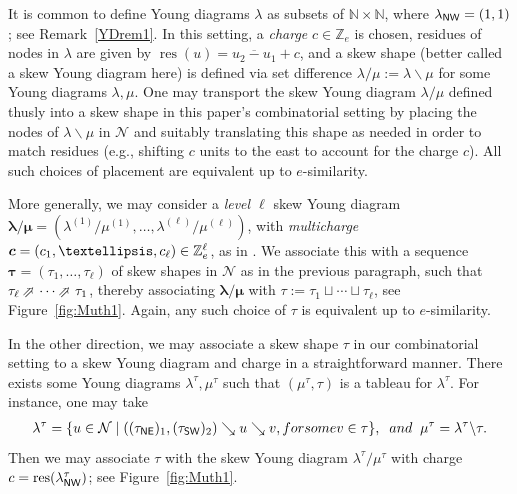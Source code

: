 \documentclass[Unicode,ALCO]{cedram}
\def\bc{\text{\boldmath$c$}}
\newcommand{\res}{\operatorname{res}}
\newcommand{\Z}{\mathbb{Z}}
\newcommand{\N}{\mathcal{N}}
\newcommand{\0}{{\bar 0}}
\newcommand{\NEarrow}{\mathbin{\rotatebox[origin=c]{45}{$\Rightarrow$}}}
\newcommand{\ZZ}{{\mathbb Z}}
\newcommand{\NN}{{\mathbb N}}
\newcommand{\nnee}{{\sf NE}}
\newcommand{\nnww}{{\sf NW}}
\newcommand{\ssww}{{\sf SW}}
\newcommand{\blam}{\boldsymbol{\lambda}}
\newcommand{\btau}{\boldsymbol{\tau}}
\newcommand{\bmu}{\boldsymbol{\mu}}
\begin{document}
It is common to define Young diagrams \( \lambda\) as subsets of \( \NN \times \NN\), where \(\lambda_{\nnww} = (1,1)\); see Remark~\ref{YDrem1}. In this setting, a {\em charge} \(c \in \ZZ_e\) is chosen, residues of nodes in \(\lambda\) are given by \(\res(u) = \overline{u_2 - u_1} + c\), and a skew shape (better called a skew Young diagram here) is defined via set difference \(\lambda / \mu := \lambda \backslash \mu\) for some Young diagrams \(\lambda, \mu\). One may transport the skew Young diagram \(\lambda/\mu\) defined thusly into a skew shape in this paper's combinatorial setting by placing the nodes of \(\lambda\backslash\mu\) in \(\N\) and suitably translating this shape as needed in order to match residues (e.g., shifting \(c\) units to the east to account for the charge \(c\)). All such choices of placement are equivalent up to \(e\)-similarity.


More generally, we may consider a {\em level \(\ell\)} skew Young diagram \(\blam/\bmu = (\lambda^{(1)}/\mu^{(1)}, \ldots, \lambda^{(\ell)}/\mu^{(\ell)})\), with {\em multicharge} \(\bc = (c_1, \ldots, c_\ell) \in \Z_e^\ell\), as in \cite{KMRUnivSpecht, HuMaCell, MuSkew}. We associate this with a sequence \(\btau = (\tau_1, \ldots, \tau_\ell)\) of skew shapes in \(\N\) as in the previous paragraph, such that \(\tau_\ell \NEarrow \cdots \NEarrow \tau_1\), thereby associating \(\blam/\bmu\) with \(\tau:= \tau_1 \sqcup \cdots \sqcup \tau_\ell\), see Figure~\ref{fig:Muth1}. Again, any such choice of \(\tau\) is equivalent up to \(e\)-similarity.

In the other direction, we may associate a skew shape \(\tau\) in our combinatorial setting to a skew Young diagram and charge in a straightforward manner. There exists some Young diagrams \(\lambda^\tau, \mu^\tau\) such that \((\mu^\tau, \tau)\) is a tableau for \(\lambda^\tau\). For instance, one may take
\begin{align*}
\lambda^\tau = \{ u \in \N \mid ((\tau_{\nnee})_1, (\tau_{\ssww})_2) \searrow u \searrow v, \textup{ for some }v \in \tau\},
\;\;
\textup{and}
\;\;
\mu^\tau = \lambda^\tau \backslash \tau.
\end{align*}
Then we may associate \(\tau\) with the skew Young diagram \(\lambda^\tau / \mu^\tau\) with charge \(c = \res(\lambda^\tau_{\nnww})\); see Figure~\ref{fig:Muth1}.
\end{document}
